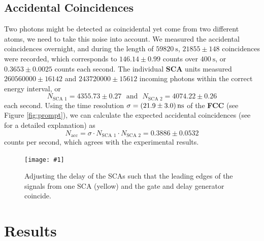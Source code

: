 \documentclass[twocolumn]{article}
\newcommand{\insertFigure}[1]{%
   \texttt{[image: \#1]}%
}
\begin{document}
\subsection{Accidental Coincidences} \label{sec:acc}
Two photons might be detected as coincidental yet come from two different atoms, we need to take this noise into account. We measured the accidental coincidences overnight, and during the length of $\SI{59820}{\second}$, $21855 \pm 148$ coincidences were recorded, which corresponds to $146.14 \pm 0.99$ counts over $\SI{400}{\second}$, or $0.3653 \pm 0.0025$
counts each second. The individual \textbf{SCA} units measured $260560000 \pm 16142$ and $243720000 \pm 15612$ incoming photons within the correct energy interval, or
 \begin{equation}
 N_{\text{SCA 1}} = 4355.73 \pm 0.27 \hspace{8pt} \text{and} \hspace{8pt} N_{\text{SCA 2}} =  4074.22 \pm 0.26 \nonumber
 \end{equation}
 each second. Using the time resolution $\sigma = \SI[separate-uncertainty = true]{21.9 \pm 3.0}{\nano \second}$ of the \textbf{FCC} (see Figure \ref{fig:prompt}), we can calculate the expected accidental coincidences (see \cite{leo} for a detailed explanation) as
\begin{equation}
N_{\text{acc}} = \sigma \cdot N_{\text{SCA 1}} \cdot N_{\text{SCA 2}} = 0.3886 \pm 0.0532 \nonumber
\end{equation}
counts per second, which agrees with the experimental results.
\begin{figure}
\centering
\insertFigure{./screenshots/SC07_cropped.png}
\caption{Adjusting the delay of the SCAs such that the leading edges of the signals from one SCA (yellow) and the gate and delay generator coincide.}
\label{fig:sca-overlap}
\end{figure}

\section{Results}
\end{document}
